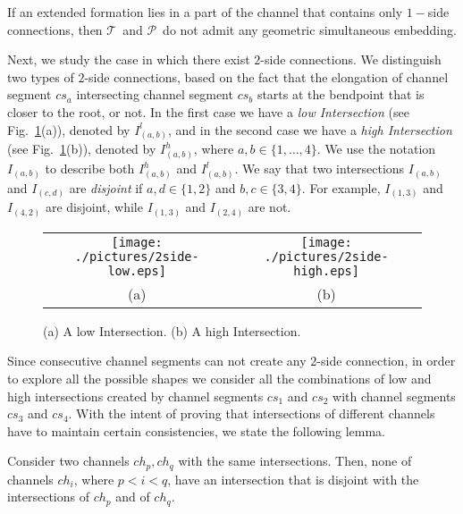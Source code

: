 \documentclass[a4paper,10pt]{llncs}
\newcommand{\T}{\mbox{$\mathcal T$ }}
\renewcommand{\P}{\mbox{$\mathcal P$ }}
\begin{document}
\begin{lemma}\label{lemma:k-nesting}
If an extended formation lies in a part of the channel that contains only $1-$side connections, then \T and \P do not admit any geometric simultaneous embedding.
\end{lemma}

Next, we study the case in which there exist $2$-side connections. We distinguish two types of $2$-side connections, based on the fact that the elongation of channel segment $cs_a$ intersecting channel segment $cs_b$ starts at the bendpoint that is closer to the root, or not. In the first case we have a \emph{low Intersection} (see Fig.~\ref{fig:intersection}(a)), denoted by $I^l_{(a,b)}$, and in the second case we have a \emph{high Intersection} (see Fig.~\ref{fig:intersection}(b)), denoted by $I^h_{(a,b)}$, where $a,b \in \{1,\dots,4\}$. We use the notation $I_{(a,b)}$ to describe both $I^h_{(a,b)}$ and $I^l_{(a,b)}$. We say that two intersections $I_{(a,b)}$ and $I_{(c,d)}$ are \emph{disjoint} if $a,d \in \{1,2\}$ and $b,c \in \{3,4\}$. For example, $I_{(1,3)}$ and $I_{(4,2)}$ are disjoint, while $I_{(1,3)}$ and $I_{(2,4)}$ are not.

\begin{figure}[htb]
\begin{center}
\begin{tabular}{c c}
\mbox{\texttt{[image: ./pictures/2side-low.eps]}} \hspace{2cm} &
\mbox{\texttt{[image: ./pictures/2side-high.eps]}} \\
(a) \hspace{2cm} & (b)\\
\end{tabular}
\caption{(a) A low Intersection. (b) A high Intersection.}
\label{fig:intersection}
\end{center}
\end{figure}

Since consecutive channel segments can not create any $2$-side connection, in order to explore all the possible shapes we consider all the combinations of low and high intersections created by channel segments $cs_1$ and $cs_2$ with channel segments $cs_3$ and $cs_4$.
With the intent of proving that intersections of different channels have to maintain certain consistencies, we state the following lemma.

\begin{lemma}\label{lem:2-different-shapes}
Consider two channels $ch_p,ch_q$ with the same intersections. Then, none of channels $ch_i$, where $p<i<q$, have an intersection that is disjoint with the intersections of $ch_p$ and of $ch_q$.
\end{lemma}
\end{document}
